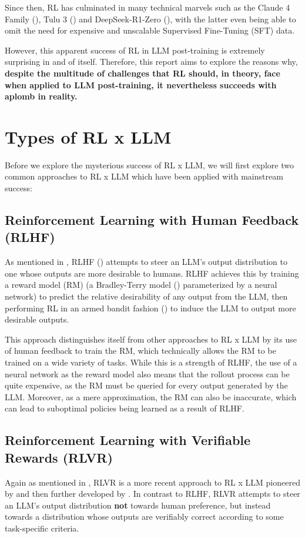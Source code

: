 \documentclass{article} %
\theoremstyle{definition}
\begin{document}
Since then, RL has culminated in many technical marvels such as 
the Claude 4 Family (\cite{Anthropic-2025}), Tulu 3 (\cite{Lambert-et-al-2024}) 
and DeepSeek-R1-Zero (\cite{DeepSeek-2025}),
with the latter even being able to omit the need for expensive and unscalable
Supervised Fine-Tuning (SFT) data.

However, this apparent success of RL in LLM post-training 
is extremely surprising in and of itself. Therefore, this report aims to explore the reasons why,
\textbf{despite the multitude of challenges that RL should, in theory, 
face when applied to LLM post-training,
it nevertheless succeeds with aplomb in reality.}

\section{Types of RL x LLM}

Before we explore the mysterious success of RL x LLM,
we will first explore two common approaches to RL x LLM which
have been applied with mainstream success:

\subsection{Reinforcement Learning with Human Feedback (RLHF)}

As mentioned in \cite{beh-2025-b}, RLHF (\cite{Christiano-et-al-2017}) attempts 
to steer an LLM's output distribution to one whose outputs are more desirable to humans.
RLHF achieves this by training a reward model (RM) (a Bradley-Terry model 
(\cite{Bradley-and-Terry-1952}) parameterized by a neural network) to predict
the relative desirability of any output from the LLM, then 
performing RL in an armed bandit fashion (\cite{Sutton-and-Barto-1998})
to induce the LLM to output more desirable outputs.

This approach distinguishes itself from other approaches to RL x LLM
by its use of human feedback to train the RM, which technically allows the RM to
be trained on a wide variety of tasks. While this is a strength of RLHF,
the use of a neural network as the reward model also means that
the rollout process can be quite expensive, as the RM must be queried
for every output generated by the LLM. Moreover, as a mere approximation,
the RM can also be inaccurate, which can lead to suboptimal policies being learned
as a result of RLHF.

\subsection{Reinforcement Learning with Verifiable Rewards (RLVR)}
Again as mentioned in \cite{beh-2025-b}, RLVR is a more recent approach to RL x LLM
pioneered by \cite{Lambert-et-al-2024} and then further developed by \cite{DeepSeek-2025}.
In contrast to RLHF, RLVR attempts to steer an LLM's output distribution \textbf{not} 
towards human preference, but instead towards a distribution whose outputs
are verifiably correct according to some task-specific criteria.
\end{document}
